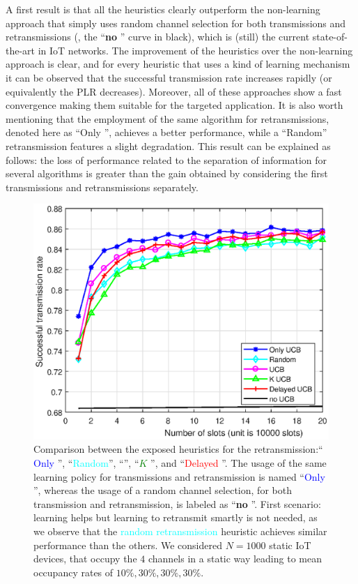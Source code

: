 A first result is that all the heuristics clearly outperform the non-learning approach that simply uses random channel selection for both transmissions and retransmissions (\ie, the ``\textbf{no \UCB{}}'' curve in black), which is (still) the current state-of-the-art in IoT networks.
The improvement of the heuristics over the non-learning approach is clear, and for every heuristic that uses a kind of learning mechanism it can be observed that the successful transmission rate increases rapidly (or equivalently the PLR decreases).
Moreover, all of these approaches show a fast convergence making them suitable for the targeted application.
It is also worth mentioning that the employment of the same \UCB{} algorithm for retransmissions, denoted here as ``Only \UCB{}'', achieves a better performance, while a ``Random'' retransmission features a slight degradation. This result can be explained as follows: the loss of performance related to the separation of information for several algorithms is greater than the gain obtained by considering the first transmissions and retransmissions separately.

\begin{figure}[h!]  %
	\centering
	\includegraphics[width=0.80\linewidth]{ResultsUCB.eps}
	\caption[First comparison between the exposed heuristics for the retransmission: ``Only \UCB'', ``Random, \UCB'', ``$K$ \UCB'', and ``Delayed \UCB'']{
		Comparison between the exposed heuristics for the retransmission:`` \textcolor{blue}{Only \UCB}'', ``\textcolor{cyan}{Random}'', ``\textcolor{purple}{\UCB}'', ``\textcolor{green}{$K$ \UCB}'', and ``\textcolor{red}{Delayed \UCB}''.
		The usage of the same learning policy for transmissions and retransmission is named ``\textcolor{blue}{Only \UCB{}}'',
		whereas the usage of a random channel selection, for both transmission and retransmission, is labeled as ``\textbf{no \UCB{}}''.
		First scenario: learning helps but learning to retransmit smartly is not needed, as we observe that the \textcolor{cyan}{random retransmission} heuristic achieves similar performance than the others.
		We considered $N=1000$ static IoT devices, that occupy the $4$ channels in a static way leading to mean occupancy rates of $10\%,30\%,30\%,30\%$.
	}
	\label{fig:43:mainExperiment1}
\end{figure}

